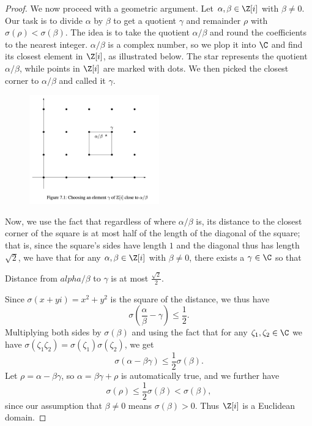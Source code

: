 \documentclass[math1530-lecture-notes]{subfiles}
\begin{document}
\begin{proof}[Proof]
  We now proceed with a geometric argument. Let $\alpha,\beta\in \Z[i]$ with $\beta\neq 0$. Our task
  is to divide $\alpha$ by $\beta$ to get a quotient $\gamma$ and remainder $\rho$ with
  $\sigma(\rho)<\sigma(\beta)$. The idea is to take the quotient $\alpha / \beta$ and round the
  coefficients to the nearest integer. $\alpha / \beta$ is a complex number, so we plop it into $\C$
  and find its closest element in $\Z[i]$, as illustrated below. The star represents the quotient
  $\alpha / \beta$, while points in $\Z[i]$ are marked with dots. We then picked the closest corner
  to $\alpha / \beta$ and called it $\gamma$.
  \begin{figure}[htpb]
    \centering
    \includegraphics[width=0.5\textwidth]{fig71.png}
  \end{figure}
  Now, we use the fact that regardless of where $\alpha / \beta$ is, its distance to the closest
  corner of the square is at most half of the length of the diagonal of the square; that is, since
  the square's sides have length $1$ and the diagonal thus has length $\sqrt{2}$, we have that for
  any $\alpha,\beta\in \Z[i]$ with $\beta\neq 0$, there exists a $\gamma\in \C$ so that \begin{center}
    Distance from $alpha / \beta$ to $\gamma$ is at most $\frac{\sqrt{2}}{2}$.
  \end{center}
  Since $\sigma(x+yi)=x^2+y^2$ is the square of the distance, we thus have \[
    \sigma\left( \frac{\alpha}{\beta} -\gamma\right) \le \frac{1}{2}
  .\] Multiplying both sides by $\sigma(\beta)$ and using the fact that for any $\zeta_1,\zeta_2\in
  \C$ we have $\sigma(\zeta_1\zeta_2)=\sigma(\zeta_1)\sigma(\zeta_2)$, we get \[
    \sigma(\alpha-\beta\gamma)\le \frac{1}{2}\sigma(\beta)
  .\] Let $\rho=\alpha-\beta\gamma$, so $\alpha=\beta\gamma+\rho$ is automatically true, and we
  further have \[
    \sigma(\rho)\le \frac{1}{2}\sigma(\beta)<\sigma(\beta)
  ,\] since our assumption that $\beta\neq 0$ means $\sigma(\beta)>0$. Thus $\Z[i]$ is a Euclidean
  domain.
\end{proof}
\end{document}
